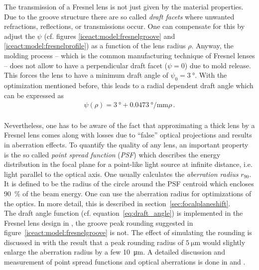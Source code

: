 The transmission of a Fresnel lens is not just given by the material properties. Due to the groove structure there are so called \textit{draft facets} where unwanted refractions, reflections, or transmissions occur. One can compensate for this by adjust the  $\psi$ (cf. figures \ref{iceact:model:fresnelgroove} and \ref{iceact:model:fresnelprofile}) as a function of the lens radius $\rho$. Anyway, the molding process -- which is the common manufacturing technique of Fresnel lenses -- does not allow to have a perpendicular draft facet ($\psi = 0$) due to mold release. This forces the lens to have a minimum draft angle of $\psi_0 = \SI{3}{\degree}$. With the optimization mentioned before, this leads to a radial dependent draft angle which can be expressed as \cite{famous:eichler, famous:niggemann}
\begin{align}
	\psi(\rho) = \SI{3}{\degree} + \SI{0.0473}{\degree\per\milli\meter}\rho\,.
	\label{eq:draft_angle}
\end{align}\\

Nevertheless, one has to be aware of the fact that approximating a thick lens by a Fresnel lens comes along with losses due to \enquote{false} optical projections and results in aberration effects. To quantify the quality of any lens, an important property is the so called \textit{point spread function} (\textit{PSF}) which describes the energy distribution in the focal plane for a point-like light source at infinite distance, i.e. light parallel to the optical axis. One usually calculates the \textit{aberration radius} $r_{90}$. It is defined to be the radius of the circle around the PSF centroid which encloses \SI{90}{\percent} of the beam energy. One can use the aberration radius for optimizations of the optics. In more detail, this is described in section~\ref{sec:focalplaneshift}.\\

The draft angle function (cf. equation~\eqref{eq:draft_angle}) is implemented in the Fresnel lens design in \geant, the groove peak rounding suggested in figure~\ref{iceact:model:fresnelgroove} is not. The effect of simulating the rounding is discussed in \cite{famous:eichler} with the result that a peak rounding radius of $\SI{5}{\micro\meter}$ would slightly enlarge the aberration radius by a few \SI{10}{\micro\meter}. A detailed discussion and measurement of point spread functions and optical aberrations is done in \cite{famous:niggemann} and \cite{famous:eichler}.

